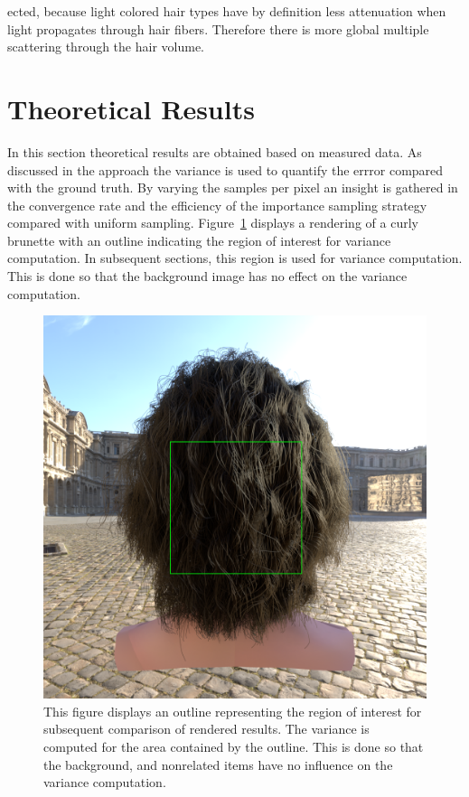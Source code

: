 \documentclass[11pt,a4paper]{report}
\begin{document}
ected, because light colored hair types have by definition less attenuation when light propagates through hair fibers. Therefore there is more global multiple scattering through the hair volume.

\section{Theoretical Results}

In this section theoretical results are obtained based on measured data. As discussed in the approach the variance is used to quantify the errror compared with the ground truth. By varying the samples per pixel an insight is gathered in the convergence rate and the efficiency of the importance sampling strategy compared with uniform sampling. Figure~\ref{fig_variance_outline} displays a rendering of a curly brunette with an outline indicating the region of interest for variance computation. In subsequent sections, this region is used for variance computation. This is done so that the background image has no effect on the variance computation.

\begin{figure}
\begin{center}
\includegraphics[scale=0.2]{variance-results/outline_hint.png}
\end{center}
\caption{This figure displays an outline representing the region of interest for subsequent comparison of rendered results. The variance is computed for the area contained by the outline. This is done so that the background, and nonrelated items have no influence on the variance computation.}
\label{fig_variance_outline}
\end{figure}
\end{document}
